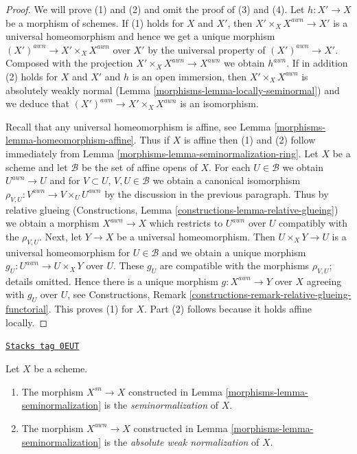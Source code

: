 \begin{proof}

We will prove (1) and (2) and omit the proof of (3) and (4).
Let $h : X' \to X$ be a morphism of schemes. If (1) holds for $X$
and $X'$, then $X' \times_X X^{awn} \to X'$ is a universal homeomorphism
and hence we get a unique morphism $(X')^{awn} \to X' \times_X X^{awn}$
over $X'$ by the universal property of $(X')^{awn} \to X'$. Composed with the
projection $X' \times_X X^{awn} \to X^{awn}$ we obtain $h^{awn}$.
If in addition (2) holds for $X$ and $X'$ and $h$ is an open immersion, then
$X' \times_X X^{awn}$ is absolutely weakly normal
(Lemma \ref{morphisms-lemma-locally-seminormal}) and we deduce that
$(X')^{awn} \to X' \times_X X^{awn}$ is an isomorphism.

\medskip\noindent
Recall that any universal homeomorphism is affine, see
Lemma \ref{morphisms-lemma-homeomorphism-affine}. Thus if $X$ is affine
then (1) and (2) follow immediately from
Lemma \ref{morphisms-lemma-seminormalization-ring}.
Let $X$ be a scheme and let $\mathcal{B}$ be the set of affine opens
of $X$. For each $U \in \mathcal{B}$ we obtain $U^{awn} \to U$
and for $V \subset U$, $V, U \in \mathcal{B}$ we obtain a canonical
isomorphism $\rho_{V, U} : V^{awn} \to V \times_U U^{awn}$ by the discussion
in the previous paragraph. Thus by relative glueing
(Constructions, Lemma \ref{constructions-lemma-relative-glueing})
we obtain a morphism $X^{awn} \to X$ which restricts
to $U^{awn}$ over $U$ compatibly with the $\rho_{V, U}$.
Next, let $Y \to X$ be a universal homeomorphism.
Then $U \times_X Y \to U$ is a universal homeomorphism for $U \in \mathcal{B}$
and we obtain a unique morphism $g_U : U^{awn} \to U \times_X Y$ over $U$.
These $g_U$ are compatible with the morphisms $\rho_{V, U}$; details
omitted. Hence there is a unique morphism $g : X^{awn} \to Y$
over $X$ agreeing with $g_U$ over $U$, see
Constructions, Remark \ref{constructions-remark-relative-glueing-functorial}.
This proves (1) for $X$. Part (2) follows because it holds affine locally.
\end{proof}

\begin{definition}[Seminormalization]
\label{morphisms-definition-seminormalization}
\href{https://stacks.math.columbia.edu/tag/0EUT}{\texttt{Stacks tag 0EUT}}

Let $X$ be a scheme.
\begin{enumerate}
\item The morphism $X^{sn} \to X$ constructed in
Lemma \ref{morphisms-lemma-seminormalization}
is the {\it seminormalization} of $X$.
\item The morphism $X^{awn} \to X$ constructed in
Lemma \ref{morphisms-lemma-seminormalization}
is the {\it absolute weak normalization} of $X$.
\end{enumerate}
\end{definition}

